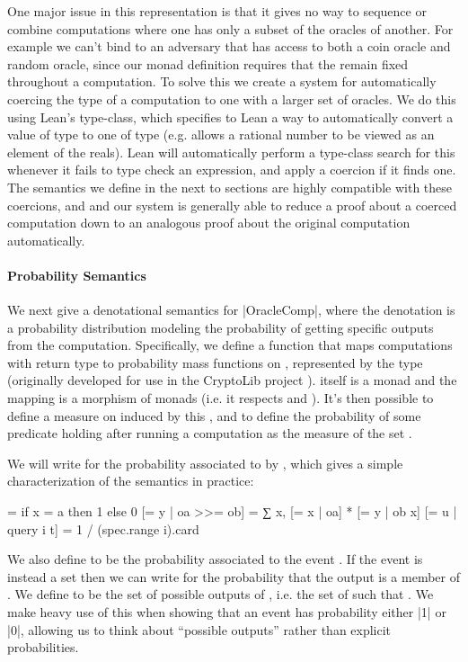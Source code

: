 One major issue in this representation is that it gives no way to sequence or combine computations where one has only a subset of the oracles of another.
For example we can't bind  to an adversary that has access to both a coin oracle and random oracle, since our monad definition requires that the  remain fixed throughout a computation.
To solve this we create a system for automatically coercing the type of a computation to one with a larger set of oracles.
We do this using Lean's  type-class, which specifies to Lean a way to automatically convert a value of type  to one of type  (e.g.  allows a rational number to be viewed as an element of the reals).
Lean will automatically perform a type-class search for this whenever it fails to type check an expression, and apply a coercion if it finds one.  
The semantics we define in the next to sections are highly compatible with these coercions, and and our system is generally able to reduce a proof about a coerced computation down to an analogous proof about the original computation automatically.

\paragraph{Probability Semantics} \label{DistSemantics}
We next give a denotational semantics for \lean|OracleComp|, where the denotation is a probability distribution modeling the probability of getting specific outputs from the computation.  Specifically, we define a function  that maps computations with return type  to probability mass functions on , represented by the type  (originally developed for use in the CryptoLib project \cite{CryptoLib}).
 itself is a monad and the mapping is a morphism of monads (i.e. it respects  and ).
It's then possible to define a measure on  induced by this , and to define the probability of some predicate  holding after running a computation as the measure of the set .

We will write \lean{[= x | oa]} for the probability associated to  by , which gives a simple characterization of the semantics in practice:
\begin{leancode}
[= x | return a] = if x = a then 1 else 0
[= y | oa >>= ob] = ∑ x, [= x | oa] * [= y | ob x]
[= u | query i t] = 1 / (spec.range i).card
\end{leancode}
We also define \lean{[p | oa]} to be the probability associated to the event .
If the event is instead a set  then we can write \lean{[(· ∈ e) | oa]} for the probability that the output is a member of . 
We define  to be the set of possible outputs of , i.e. the set of  such that .
We make heavy use of this when showing that an event has probability either \lean|1| or \lean|0|, allowing us to think about ``possible outputs'' rather than explicit probabilities.

